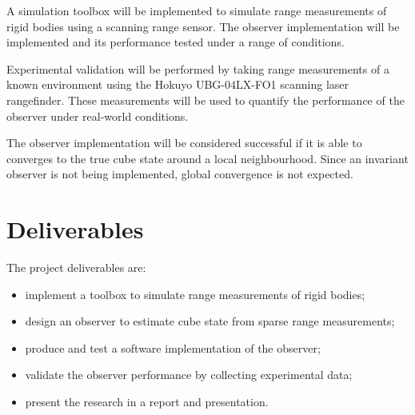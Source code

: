 A simulation toolbox will be implemented to simulate range measurements of rigid bodies using a scanning range sensor. The observer implementation will be implemented and its performance tested under a range of conditions. 

Experimental validation will be performed by taking range measurements of a known environment using the Hokuyo UBG-04LX-FO1 scanning laser rangefinder. These measurements will be used to quantify the performance of the observer under real-world conditions.

The observer implementation will be considered successful if it is able to converges to the true cube state around a local neighbourhood. Since an invariant observer is not being implemented, global convergence is not expected.

\section{Deliverables}
The project deliverables are:
\begin{itemize}
\item implement a toolbox to simulate range measurements of rigid bodies;
\item design an observer to estimate cube state from sparse range measurements;
\item produce and test a software implementation of the observer;
\item validate the observer performance by collecting experimental data;
\item present the research in a report and presentation.
\end{itemize}
